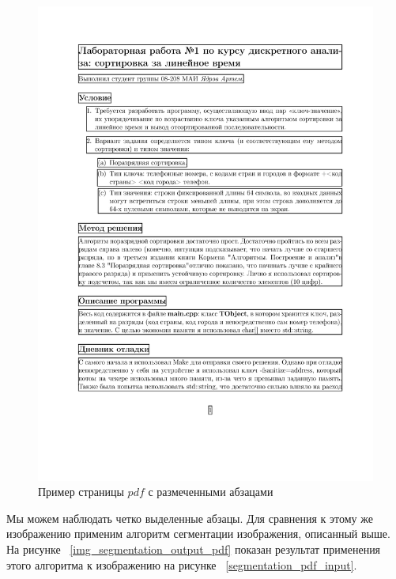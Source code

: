 \begin{figure}
    \includegraphics[scale=0.65]{img/paragraph/pdf_output.jpg}
    \caption{Пример страницы $pdf$ с размеченными абзацами}
    \label{segmentation_pdf_output}
\end{figure}

Мы можем наблюдать четко выделенные абзацы. Для сравнения к этому же изображению применим алгоритм сегментации изображения, описанный выше. 
На рисунке ~\ref{img_segmentation_output_pdf} показан результат применения этого алгоритма к изображению на рисунке ~\ref{segmentation_pdf_input}.

